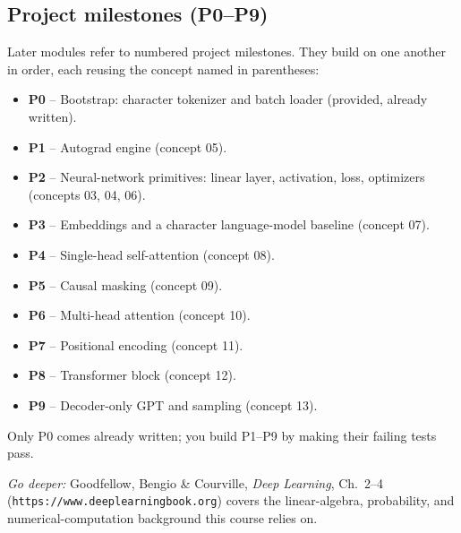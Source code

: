\subsection*{Project milestones (P0--P9)}
Later modules refer to numbered project milestones. They build on one another in
order, each reusing the concept named in parentheses:
\begin{itemize}
  \item \textbf{P0} -- Bootstrap: character tokenizer and batch loader (provided, already written).
  \item \textbf{P1} -- Autograd engine (concept 05).
  \item \textbf{P2} -- Neural-network primitives: linear layer, activation, loss, optimizers (concepts 03, 04, 06).
  \item \textbf{P3} -- Embeddings and a character language-model baseline (concept 07).
  \item \textbf{P4} -- Single-head self-attention (concept 08).
  \item \textbf{P5} -- Causal masking (concept 09).
  \item \textbf{P6} -- Multi-head attention (concept 10).
  \item \textbf{P7} -- Positional encoding (concept 11).
  \item \textbf{P8} -- Transformer block (concept 12).
  \item \textbf{P9} -- Decoder-only GPT and sampling (concept 13).
\end{itemize}
Only P0 comes already written; you build P1--P9 by making their failing tests pass.

\medskip
\noindent\textit{Go deeper:} Goodfellow, Bengio \& Courville, \emph{Deep
Learning}, Ch.~2--4 (\texttt{https://www.deeplearningbook.org}) covers the
linear-algebra, probability, and numerical-computation background this course
relies on.
